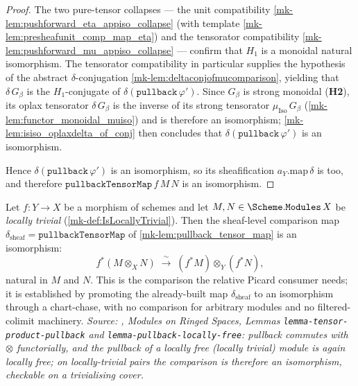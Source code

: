 \begin{proof}
  The two pure-tensor collapses --- the unit compatibility
  \ref{mk-lem:pushforward_eta_appiso_collapse} (with template \ref{mk-lem:presheafunit_comp_map_eta})
  and the tensorator compatibility \ref{mk-lem:pushforward_mu_appiso_collapse} --- confirm that
  \(H_1\) is a monoidal natural isomorphism. The tensorator compatibility in particular supplies
  the hypothesis of the abstract \(\delta\)-conjugation \ref{mk-lem:deltaconjofmucomparison},
  yielding that \(\delta\,G_\beta\) is the \(H_1\)-conjugate of
  \(\delta(\mathtt{pullback}\,\varphi')\). Since \(G_\beta\) is strong monoidal (\textbf{H2}),
  its oplax tensorator \(\delta\,G_\beta\) is the inverse of its strong tensorator
  \(\mu_{\mathrm{Iso}}\,G_\beta\) (\ref{mk-lem:functor_monoidal_muiso}) and is therefore an
  isomorphism; \ref{mk-lem:isiso_oplaxdelta_of_conj} then concludes that
  \(\delta(\mathtt{pullback}\,\varphi')\) is an isomorphism.

  Hence \(\delta(\mathtt{pullback}\,\varphi')\) is an isomorphism, so
  its sheafification \(a_Y.\mathrm{map}\,\delta\) is too, and therefore
  \(\mathtt{pullbackTensorMap}\,f\,M\,N\) is an isomorphism.
\end{proof}

\begin{lemma}\label{mk-lem:pullback_tensor_iso_loctriv}

  Let \(f : Y \to X\) be a morphism of schemes and let
  \(M, N \in \Scheme.\mathtt{Modules}\,X\) be \emph{locally trivial}
  (\ref{mk-def:IsLocallyTrivial}). Then the sheaf-level comparison map
  \(\delta_{\mathrm{sheaf}} = \mathtt{pullbackTensorMap}\) of
  \ref{mk-lem:pullback_tensor_map} is an isomorphism:
  \[
    f^*(M \otimes_X N)
      \;\xrightarrow{\;\sim\;}\;
    (f^*M) \otimes_Y (f^*N),
  \]
  natural in \(M\) and \(N\). This is the comparison the relative Picard consumer needs;
  it is established by promoting the already-built map \(\delta_{\mathrm{sheaf}}\) to an
  isomorphism through a chart-chase, with no comparison for arbitrary modules and no
  filtered-colimit machinery.
  \textit{Source: \cite{stacks-project}, Modules on Ringed Spaces, Lemmas
  \texttt{lemma-tensor-product-pullback} and \texttt{lemma-pullback-locally-free}:
  pullback commutes with \(\otimes\) functorially, and the pullback of a locally free
  (locally trivial) module is again locally free; on locally-trivial pairs the comparison
  is therefore an isomorphism, checkable on a trivialising cover.}
\end{lemma}

